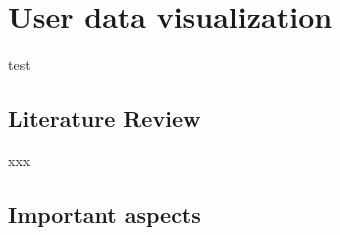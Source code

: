 \section{User data visualization}
test
\subsection{Literature Review}
xxx
\subsection{Important aspects}
